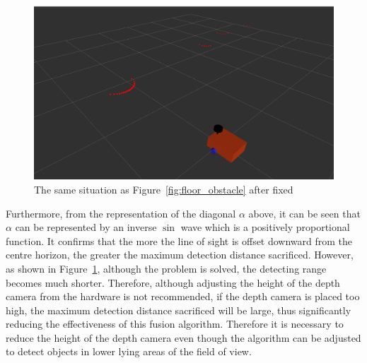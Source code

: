\begin{figure}[H]
    \centering
    \includegraphics[width=0.8\linewidth]{figs/ground_fixed.png}
    \caption{The same situation as Figure~\ref{fig:floor_obstacle} after fixed}
    \label{fig:fixed}
\end{figure}

Furthermore, from the representation of the diagonal $\alpha$ above, 
it can be seen that $\alpha$ can be represented by an inverse $\sin$ wave which is a positively proportional function. 
It confirms that the more the line of sight is offset downward from the centre horizon, 
the greater the maximum detection distance sacrificed.
However, as shown in Figure~\ref{fig:fixed}, although the problem is solved, the detecting range becomes much shorter.
Therefore, although adjusting the height of the depth camera from the hardware is not recommended, 
if the depth camera is placed too high, the maximum detection distance sacrificed will be large, 
thus significantly reducing the effectiveness of this fusion algorithm. 
Therefore it is necessary to reduce the height of the depth camera even though the algorithm can be adjusted to detect objects in lower lying areas of the field of view.

